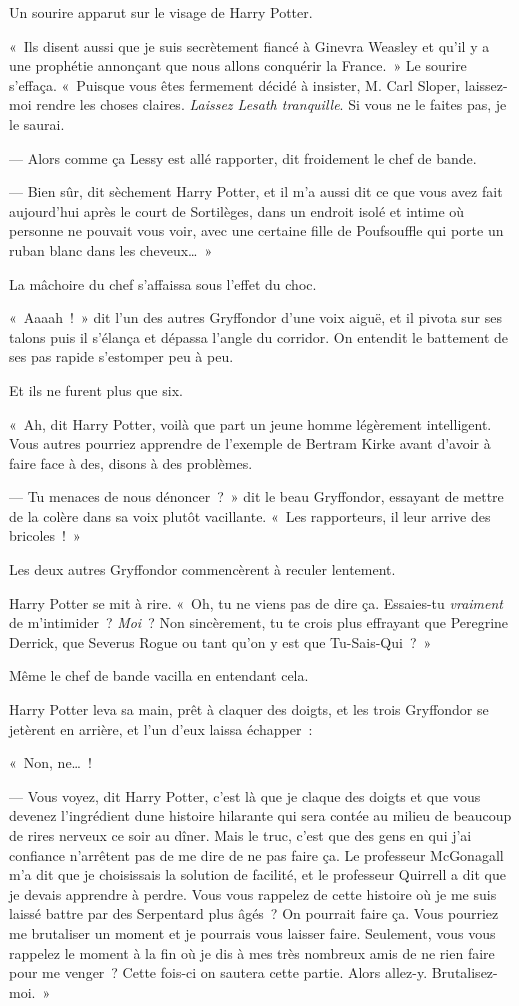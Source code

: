 Un sourire apparut sur le visage de Harry Potter.

«~Ils disent aussi que je suis secrètement fiancé à Ginevra Weasley et qu'il y a une prophétie annonçant que nous allons conquérir la France.~» Le sourire s'effaça. «~Puisque vous êtes fermement décidé à insister, M. Carl Sloper, laissez-moi rendre les choses claires. \emph{Laissez Lesath tranquille}. Si vous ne le faites pas, je le saurai.

--- Alors comme ça Lessy est allé rapporter, dit froidement le chef de bande.

--- Bien sûr, dit sèchement Harry Potter, et il m'a aussi dit ce que vous avez fait aujourd'hui après le court de Sortilèges, dans un endroit isolé et intime où personne ne pouvait vous voir, avec une certaine fille de Poufsouffle qui porte un ruban blanc dans les cheveux…~»

La mâchoire du chef s'affaissa sous l'effet du choc.

«~Aaaah~!~» dit l'un des autres Gryffondor d'une voix aiguë, et il pivota sur ses talons puis il s'élança et dépassa l'angle du corridor. On entendit le battement de ses pas rapide s'estomper peu à peu.

Et ils ne furent plus que six.

«~Ah, dit Harry Potter, voilà que part un jeune homme légèrement intelligent. Vous autres pourriez apprendre de l'exemple de Bertram Kirke avant d'avoir à faire face à des, disons à des problèmes.

--- Tu menaces de nous dénoncer~?~» dit le beau Gryffondor, essayant de mettre de la colère dans sa voix plutôt vacillante. «~Les rapporteurs, il leur arrive des bricoles~!~»

Les deux autres Gryffondor commencèrent à reculer lentement.

Harry Potter se mit à rire. «~Oh, tu ne viens pas de dire ça. Essaies-tu \emph{vraiment} de m'intimider~? \emph{Moi}~? Non sincèrement, tu te crois plus effrayant que Peregrine Derrick, que Severus Rogue ou tant qu'on y est que Tu-Sais-Qui~?~»

Même le chef de bande vacilla en entendant cela.

Harry Potter leva sa main, prêt à claquer des doigts, et les trois Gryffondor se jetèrent en arrière, et l'un d'eux laissa échapper~:

«~Non, ne…~!

--- Vous voyez, dit Harry Potter, c'est là que je claque des doigts et que vous devenez l'ingrédient dune histoire hilarante qui sera contée au milieu de beaucoup de rires nerveux ce soir au dîner. Mais le truc, c'est que des gens en qui j'ai confiance n'arrêtent pas de me dire de ne pas faire ça. Le professeur McGonagall m'a dit que je choisissais la solution de facilité, et le professeur Quirrell a dit que je devais apprendre à perdre. Vous vous rappelez de cette histoire où je me suis laissé battre par des Serpentard plus âgés~? On pourrait faire ça. Vous pourriez me brutaliser un moment et je pourrais vous laisser faire. Seulement, vous vous rappelez le moment à la fin où je dis à mes très nombreux amis de ne rien faire pour me venger~? Cette fois-ci on sautera cette partie. Alors allez-y. Brutalisez-moi.~»

